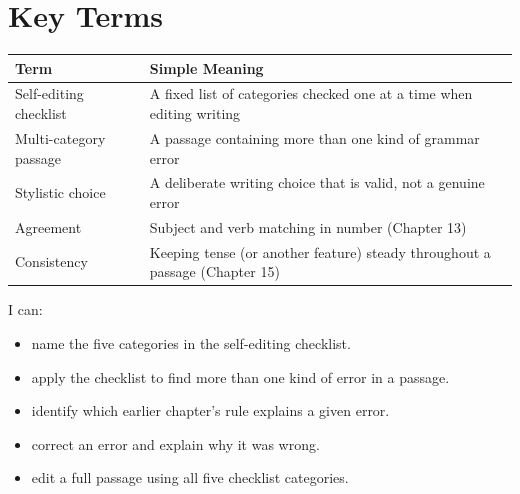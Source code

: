 \section{Key Terms}
\begin{table}[h!]
\centering
\begin{tabular}{|l|p{9cm}|}
\hline
\textbf{Term} & \textbf{Simple Meaning} \\
\hline
Self-editing checklist & A fixed list of categories checked one at a time when editing writing \\
Multi-category passage & A passage containing more than one kind of grammar error \\
Stylistic choice & A deliberate writing choice that is valid, not a genuine error \\
Agreement & Subject and verb matching in number (Chapter 13) \\
Consistency & Keeping tense (or another feature) steady throughout a passage (Chapter 15) \\
\hline
\end{tabular}
\end{table}

\begin{selfcheck}
I can:
\begin{itemize}
    \item name the five categories in the self-editing checklist.
    \item apply the checklist to find more than one kind of error in a passage.
    \item identify which earlier chapter's rule explains a given error.
    \item correct an error and explain why it was wrong.
    \item edit a full passage using all five checklist categories.
\end{itemize}
\end{selfcheck}